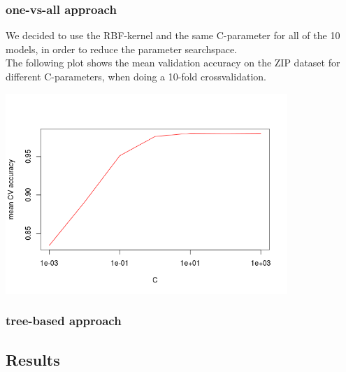\subsubsection{one-vs-all approach}

We decided to use the RBF-kernel and the same C-parameter for all of the 10 models,
in order to reduce the parameter searchspace.\\
The following plot shows the mean validation accuracy on the ZIP dataset
for different C-parameters, when doing a 10-fold crossvalidation.

\includegraphics[width=0.8\textwidth]{../plots/one_vs_all_zip}

\subsubsection{tree-based approach}


\subsection{Results}